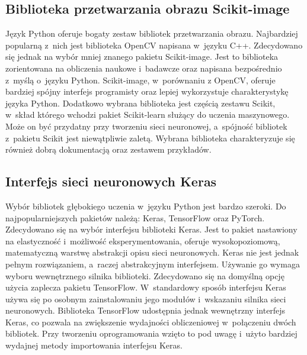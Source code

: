 \subsection{Biblioteka przetwarzania obrazu Scikit-image}
Język Python oferuje bogaty zestaw bibliotek przetwarzania obrazu.
Najbardziej popularną z~nich jest biblioteka OpenCV napisana w~języku C++.
Zdecydowano się jednak na wybór mniej znanego pakietu Scikit-image.
Jest to biblioteka zorientowana na obliczenia naukowe i~badawcze
oraz napisana bezpośrednio z~myślą o~języku Python.
Scikit-image, w~porównaniu z OpenCV, oferuje bardziej spójny interfejs
programisty oraz lepiej wykorzystuje charakterystykę języka Python.
Dodatkowo wybrana biblioteka jest częścią zestawu Scikit, w~skład
którego wchodzi pakiet Scikit-learn służący do uczenia maszynowego.
Może on być przydatny przy tworzeniu sieci neuronowej, a~spójność bibliotek
z~pakietu Scikit jest niewątpliwie zaletą.
Wybrana biblioteka charakteryzuje się również dobrą dokumentacją oraz
zestawem przykładów.

\subsection{Interfejs sieci neuronowych Keras}
\label{subsec:software_network}
Wybór bibliotek głębokiego uczenia w~języku Python jest bardzo szeroki.
Do najpopularniejszych pakietów należą: Keras, TensorFlow oraz PyTorch.
Zdecydowano się na wybór interfejsu biblioteki Keras.
Jest to pakiet nastawiony na elastyczność i~możliwość eksperymentowania,
oferuje wysokopoziomową, matematyczną warstwę abstrakcji opisu sieci
neuronowych.
Keras nie jest jednak pełnym rozwiązaniem, a~raczej abstrakcyjnym interfejsem.
Używanie go wymaga wyboru wewnętrznego silnika biblioteki.
Zdecydowano się na domyślną opcję użycia zaplecza pakietu TensorFlow.
W~standardowy sposób interfejsu Keras używa się po osobnym zainstalowaniu
jego modułów i~wskazaniu silnika sieci neuronowych.
Biblioteka TensorFlow udostępnia jednak wewnętrzny interfejs Keras,
co pozwala na zwiększenie wydajności obliczeniowej w~połączeniu dwóch
bibliotek.
Przy tworzeniu oprogramowania wzięto to pod uwagę i~użyto bardziej wydajnej
metody importowania interfejsu Keras.
